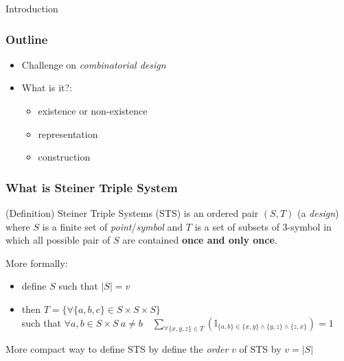 	\begin{frame}[plain,c]
		\begin{center}
			\huge Introduction
		\end{center}
	\end{frame}


	\begin{frame}
		\frametitle{Outline}
		\begin{itemize}
			\item Challenge on \textit{combinatorial design}%
			\item What is it?:
			\begin{itemize}
				\item existence or non-existence
				\item representation
				\item construction
			\end{itemize}
		\end{itemize}
	\end{frame}

	
	\begin{frame}
		\frametitle{What is Steiner Triple System }
		\begin{block}{(Definition) Steiner Triple Systems (STS)}
			is an ordered pair $(S,T)$ (a \textit{design}) where $S$ is a finite set of \textit{point}/\textit{symbol} and $T$ is a set of subsets of 3-symbol in which all possible pair of $S$ are contained \textbf{once and only once}.\\
			 
		\end{block}
	
	\pause
	
	
	More formally:\\
	\begin{itemize}
		\item define $S$ such that $|S|=v$
		\item 	then $T = \{ \forall \{a,b,c\} \in S\times S \times S\}$\\
		 such that $\forall a,b \in S \times S \ a \not = b  \quad \sum_{ \forall \{x,y,z\} \in T} (\mathbb{I}_{ \{ a,b \} \in \{x,y\} \wedge \{y,z\} \wedge \{z,x\} }) = 1 $
	\end{itemize}
	More compact way to define STS by define the \textit{order} $v$ of STS by $v = |S|$
	\end{frame}

